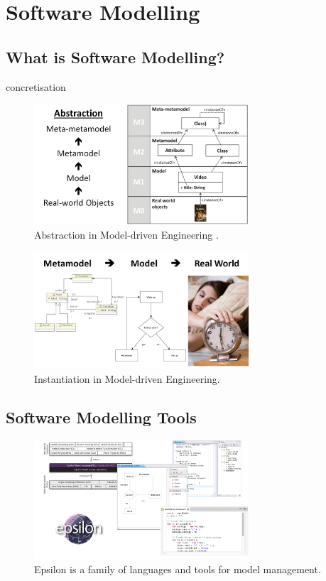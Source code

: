 \documentclass[12pt, a4paper]{report}
\begin{document}
\section{Software Modelling}

\subsection{What is Software Modelling?}

concretisation
\begin{figure}[ht]
\centering
\includegraphics[width=8cm]{abstraction}
\caption{Abstraction in Model-driven Engineering \cite{brambilla2012model}.}
\label{fig:abstraction}
\end{figure}


\begin{figure}[ht]
\centering
\includegraphics[width=8cm]{concretisation}
\caption{Instantiation in Model-driven Engineering.}
\label{fig:concretisation}
\end{figure}

\subsection{Software Modelling Tools}

\begin{figure}[ht]
\centering
\includegraphics[width=8cm]{epsilon}
\caption{Epsilon is a family of languages and tools for model management\cite{kolovos2015eugenia}.}
\label{fig:epsilon}
\end{figure}
\end{document}
